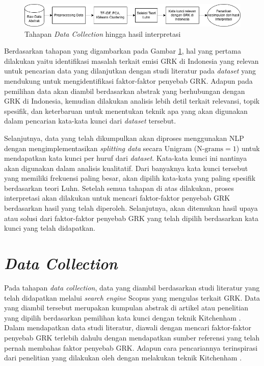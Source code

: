 \begin{figure}
    \centering
    \includegraphics[width=0.95\linewidth]{img/bab3-12.png}
    \caption{Tahapan \textit{Data Collection} hingga hasil interpretasi}
    \label{fig:3-12}
\end{figure}

Berdasarkan tahapan yang digambarkan pada Gambar \ref{fig:3-12}, hal yang pertama dilakukan yaitu identifikasi masalah terkait emisi GRK di Indonesia yang relevan untuk pencarian data yang dilanjutkan dengan studi literatur pada \textit{dataset} yang mendukung untuk mengidentifikasi faktor-faktor penyebab GRK. Adapun pada pemilihan data akan diambil berdasarkan abstrak yang berhubungan dengan GRK di Indonesia, kemudian dilakukan analisis lebih detil terkait relevansi, topik spesifik, dan keterbaruan untuk menentukan teknik apa yang akan digunakan dalam pencarian kata-kata kunci dari \textit{dataset} tersebut.

Selanjutnya, data yang telah dikumpulkan akan diproses menggunakan NLP dengan mengimplementasikan \textit{splitting data} secara Unigram ($\text{N-grams}=1$) untuk mendapatkan kata kunci per huruf dari \textit{dataset}. Kata-kata kunci ini nantinya akan digunakan dalam analisis kualitatif. Dari banyaknya kata kunci tersebut yang memiliki frekuensi paling besar, akan dipilih kata-kata yang paling spesifik berdasarkan teori Luhn. Setelah semua tahapan di atas dilakukan, proses interpretasi akan dilakukan untuk mencari faktor-faktor penyebab GRK berdasarkan hasil yang telah diperoleh. Selanjutnya, akan ditemukan hasil upaya atau solusi dari faktor-faktor penyebab GRK yang telah dipilih berdasarkan kata kunci yang telah didapatkan.

\section{\textit{Data Collection}}
Pada tahapan \textit{data collection}, data yang diambil berdasarkan studi literatur yang telah didapatkan melalui \textit{search engine} Scopus yang mengulas terkait GRK. Data yang diambil tersebut merupakan kumpulan abstrak di artikel atau penelitian yang dipilih berdasarkan pemilihan kata kunci dengan teknik Kitchenham \cite{kitchenham_systematic_2009}. Dalam mendapatkan data studi literatur, diawali dengan mencari faktor-faktor penyebab GRK terlebih dahulu dengan mendapatkan sumber referensi yang telah pernah membahas faktor penyebab GRK. Adapun cara pencariannya terinspirasi dari penelitian yang dilakukan oleh \cite{yunita_finding_2022} dengan melakukan teknik Kitchenham \cite{kitchenham_systematic_2009}.

